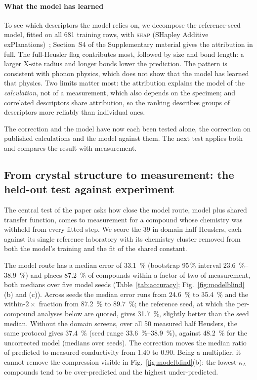 \paragraph{What the model has learned}
\label{sec:shap}

To see which descriptors the model relies on, we decompose the reference-seed model, fitted on all
\num{681} training rows, with \textsc{shap} (SHapley Additive exPlanations)~\cite{lundberg2017a};
Section~S4 of the Supplementary material gives the attribution in full. The full-Heusler flag
contributes most, followed by size and bond length: a larger X-site radius and longer bonds lower
the prediction. The pattern is consistent with phonon physics, which does not show that the model
has learned that physics. Two limits matter most: the attribution explains the model of the
\emph{calculation}, not of a measurement, which also depends on the specimen; and correlated
descriptors share attribution, so the ranking describes groups of descriptors more reliably than
individual ones.

The correction and the model have now each been tested alone, the correction on published
calculations and the model against them. The next test applies both and compares the result with measurement.

\subsection{From crystal structure to measurement: the held-out test against experiment}
\label{sec:blind}

The central test of the paper asks how close the model route, model plus shared transfer function,
comes to measurement for a compound whose chemistry was withheld from every fitted step. We score
the \num{39} in-domain half Heuslers, each against its single reference laboratory with its chemistry cluster removed from both the model's training and the fit of the shared constant.

The model route has a median error of \SI{33.1}{\percent} (bootstrap 95\,\% interval
\SIrange{23.6}{38.9}{\percent}) and places \SI{87.2}{\percent} of compounds within a factor of two
of measurement, both medians over five model seeds (Table~\ref{tab:accuracy};
Fig.~\ref{fig:modelblind}(b) and (c)). Across seeds the median error runs from \SI{24.6}{\percent}
to \SI{35.4}{\percent} and the within-$2\times$ fraction from \SI{87.2}{\percent} to
\SI{89.7}{\percent}; the reference seed, at which the per-compound analyses below are quoted, gives
\SI{31.7}{\percent}, slightly better than the seed median. Without the domain screens, over all
\num{50} measured half Heuslers, the same protocol gives \SI{37.4}{\percent} (seed range
\SIrange{33.6}{38.9}{\percent}), against \SI{48.2}{\percent} for the uncorrected model (medians over
seeds). The correction moves the median ratio of predicted to measured conductivity from \num{1.40}
to \num{0.90}. Being a multiplier, it cannot remove the compression visible in
Fig.~\ref{fig:modelblind}(b): the lowest-$\kappa_L$ compounds tend to be over-predicted and the
highest under-predicted.

